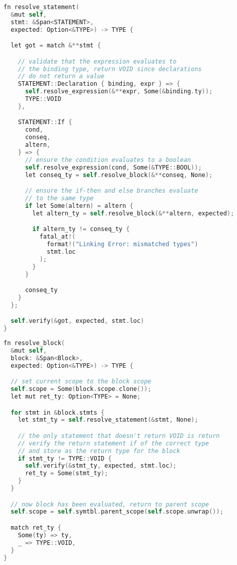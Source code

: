 \begin{lstlisting}[language=C]
fn resolve_statement(
  &mut self, 
  stmt: &Span<STATEMENT>, 
  expected: Option<&TYPE>) -> TYPE {

  let got = match &**stmt {

    // validate that the expression evaluates to 
    // the binding type, return VOID since declarations 
    // do not return a value
    STATEMENT::Declaration { binding, expr } => {
      self.resolve_expression(&**expr, Some(&binding.ty));
      TYPE::VOID
    },

    STATEMENT::If {
      cond,
      conseq,
      altern,
    } => {
      // ensure the condition evaluates to a boolean
      self.resolve_expression(cond, Some(&TYPE::BOOL));
      let conseq_ty = self.resolve_block(&**conseq, None);

      // ensure the if-then and else branches evaluate 
      // to the same type
      if let Some(altern) = altern {
        let altern_ty = self.resolve_block(&**altern, expected);

        if altern_ty != conseq_ty {
          fatal_at!(
            format!("Linking Error: mismatched types")
            stmt.loc
          );
        }
      }

      conseq_ty
    }
  };

  self.verify(&got, expected, stmt.loc)
}
\end{lstlisting}

\begin{lstlisting}[language=C]
fn resolve_block(
  &mut self, 
  block: &Span<Block>, 
  expected: Option<&TYPE>) -> TYPE {

  // set current scope to the block scope
  self.scope = Some(block.scope.clone());
  let mut ret_ty: Option<TYPE> = None;

  for stmt in &block.stmts {
    let stmt_ty = self.resolve_statement(&stmt, None);

    // the only statement that doesn't return VOID is return 
    // verify the return statement if of the correct type 
    // and store as the return type for the block
    if stmt_ty != TYPE::VOID {
      self.verify(&stmt_ty, expected, stmt.loc);
      ret_ty = Some(stmt_ty);
    }
  }

  // now block has been evaluated, return to parent scope
  self.scope = self.symtbl.parent_scope(self.scope.unwrap());

  match ret_ty {
    Some(ty) => ty,
    _ => TYPE::VOID,
  }
}
\end{lstlisting}

